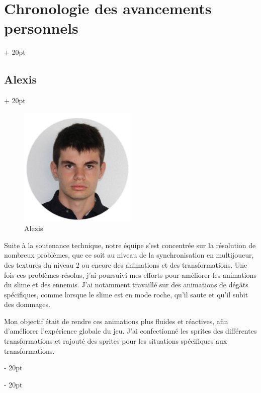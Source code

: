 \documentclass[a4paper, 12pt, twoside]{article}
\newcommand{\ind}[1][20pt]{\advance\leftskip + #1}
\newcommand{\deind}[1][20pt]{\advance\leftskip - #1}
\newenvironment{indt}[2][20pt]{#2 \par \ind[#1]}{\par \deind} %
\begin{document}
\begin{indt}{\section{Chronologie des avancements personnels}}
        \begin{indt}{\subsection{Alexis}}
            \begin{figure}[h]
                \centering
                \includegraphics[width=0.5\textwidth]{alexis.png}
                \caption{Alexis}
                \label{fig:mesh1}
            \end{figure}

            Suite à la soutenance technique, notre équipe s'est concentrée sur la résolution de nombreux problèmes, que ce soit au niveau de la synchronisation en multijoueur, des textures du niveau 2 ou encore des animations et des transformations. Une fois ces problèmes résolus, j'ai poursuivi mes efforts pour améliorer les animations du slime et des ennemis. J'ai notamment travaillé sur des animations de dégâts spécifiques, comme lorsque le slime est en mode roche, qu'il saute et qu'il subit des dommages.

            Mon objectif était de rendre ces animations plus fluides et réactives, afin d'améliorer l'expérience globale du jeu. J’ai confectionné les sprites des différentes transformations et rajouté des sprites pour les situations spécifiques aux transformations.

        \end{indt}

        \newpage


\end{indt}
\end{document}
